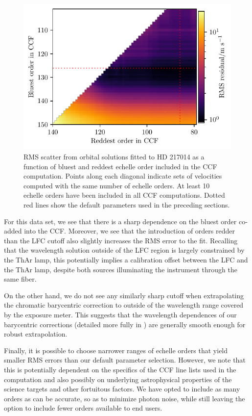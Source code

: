 \begin{figure}
\centering
\includegraphics[width=\textwidth]{figures-4/vel_orders_217014.pdf}
\caption{RMS scatter from orbital solutions fitted to HD 217014 as a function of bluest and reddest echelle order included in the CCF computation. Points along each diagonal indicate sets of velocities computed with the same number of echelle orders. At least 10 echelle orders have been included in all CCF computations. Dotted red lines show the default parameters used in the preceding sections.\label{fig:orders}}
\end{figure}

For this data set, we see that there is a sharp dependence on the bluest order co-added into the CCF. Moreover, we see that the introduction of orders redder than the LFC cutoff also slightly increases the RMS error to the fit. Recalling that the wavelength solution outside of the LFC region is largely constrained by the ThAr lamp, this potentially implies a calibration offset between the LFC and the ThAr lamp, despite both sources illuminating the instrument through the same fiber.

On the other hand, we do not see any similarly sharp cutoff when extrapolating the chromatic barycentric correction to outside of the wavelength range covered by the exposure meter. This suggests that the wavelength dependences of our barycentric corrections (detailed more fully in \citealt{blackman_measured_2019}) are generally smooth enough for robust extrapolation.

Finally, it is possible to choose narrower ranges of echelle orders that yield smaller RMS errors than our default parameter selection. However, we note that this is potentially dependent on the specifics of the CCF line lists used in the computation and also possibly on underlying astrophysical properties of the science targets and other fortuitous factors. We have opted to include as many orders as can be accurate, so as to minimize photon noise, while still leaving the option to include fewer orders available to end users.



